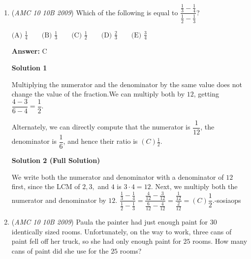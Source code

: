 \begin{enumerate}
\begin{enumerate}
            \end{enumerate}
            



\textbf{Solution 4 (Casework, similar to others)}

We require
 \[\frac{1}{2} m + \frac{3}{4} b \in \mathbb{Z}\].We approach with standard casework. Obviously, letting $m=0,b=5$ or vice versa does not work. If $m = 1,b=4$ the right side is integral whereas the left side is not on the LHS. The same applies for the versa of that case. If $m = 2. b = 3$ then the left side is integral but the right is not of the LHS. However, when $m=3, b=2$, we have that $\frac{3}{2} + \frac{3}{2}  = 3$ is indeed integral. The answer is $\boxed{2}$.

 


	\item (\textit{AMC 10 10B 2009}) Which of the following is equal to $\dfrac{\frac{1}{3}-\frac{1}{4}}{\frac{1}{2}-\frac{1}{3}}$?


 $\text{(A) } \frac 14 \qquad \text{(B) } \frac 13 \qquad \text{(C) } \frac 12 \qquad \text{(D) } \frac 23 \qquad \text{(E) } \frac 34$

 \textbf{Answer: }C



\textbf{Solution 1}

Multiplying the numerator and the denominator by the same value does not change the value of the fraction.We can multiply both by $12$, getting $\dfrac{4-3}{6-4} = \boxed{\dfrac 12}$.

 Alternately, we can directly compute that the numerator is $\dfrac 1{12}$, the denominator is $\dfrac 16$, and hence their ratio is $\boxed{(C)\frac{1}{2}}$.

 



\textbf{Solution 2 (Full Solution)}

We write both the numerator and denominator with a denominator of $12$ first, since the LCM of $2,3,$ and $4$ is $3\cdot4=12$. Next, we multiply both the numerator and denominator by $12$. $\dfrac{\frac{1}{3}-\frac{1}{4}}{\frac{1}{2}-\frac{1}{3}}=\dfrac{\frac{4}{12}-\frac{3}{12}}{\frac{6}{12}-\frac{4}{12}}=\dfrac{\frac{1}{12}}{\frac{2}{12}}=\boxed{(C)\dfrac{1}{2}}$.-sosiaops

 


	\item (\textit{AMC 10 10B 2009}) Paula the painter had just enough paint for $30$ identically sized rooms.  Unfortunately, on the way to work, three cans of paint fell off her truck, so she had only enough paint for $25$ rooms.  How many cans of paint did she use for the $25$ rooms?



\end{enumerate}
